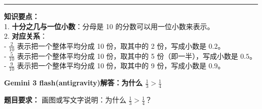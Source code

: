 \documentclass[12pt, a4paper]{ctexart}
\begin{document}
\vspace{1.0cm}
\hrule
\vspace{0.4cm}

{\small
\textbf{知识要点：} \\
1. \textbf{十分之几与一位小数}：分母是 10 的分数可以用一位小数来表示。 \\
2. \textbf{对应关系}： \\
   - $\frac{2}{10}$ 表示把一个整体平均分成 10 份，取其中的 2 份，写成小数是 $0.2$。 \\
   - $\frac{5}{10}$ 表示把一个整体平均分成 10 份，取其中的 5 份（即一半），写成小数是 $0.5$。 \\
   - $\frac{9}{10}$ 表示把一个整体平均分成 10 份，取其中的 9 份，写成小数是 $0.9$。
}


\newpage

\begin{center}
  {\large\bfseries Gemini 3 flash(antigravity)解答：为什么 $\frac{1}{3} > \frac{1}{4}$}
\end{center}

\vspace{0.6cm}

\noindent
{\small \textbf{题目要求：} 画图或写文字说明：为什么 $\frac{1}{3} > \frac{1}{4}$？}

\vspace{1.0cm}
\end{document}
